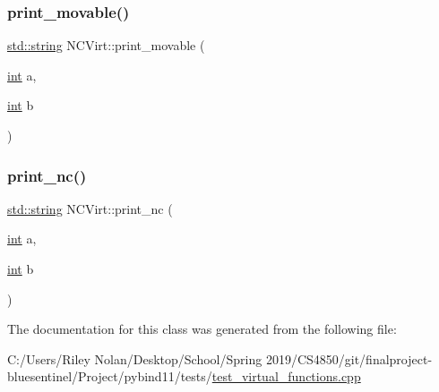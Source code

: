 \mbox{\label{class_n_c_virt_a215b109d2ee58a323ca9628df7e9dacc}} 
\subsubsection{\texorpdfstring{print\_movable()}{print\_movable()}}
{\footnotesize\ttfamily \mbox{\hyperlink{_s_d_l__opengl__glext_8h_ab4ccfaa8ab0e1afaae94dc96ef52dde1}{std\+::string}} N\+C\+Virt\+::print\+\_\+movable (\begin{DoxyParamCaption}\item[{\mbox{\hyperlink{warnings_8h_a74f207b5aa4ba51c3a2ad59b219a423b}{int}}}]{a,  }\item[{\mbox{\hyperlink{warnings_8h_a74f207b5aa4ba51c3a2ad59b219a423b}{int}}}]{b }\end{DoxyParamCaption})\hspace{0.3cm}{\ttfamily [inline]}}

\mbox{\label{class_n_c_virt_a2faacf010762ae47c633a828c6710e99}} 
\subsubsection{\texorpdfstring{print\_nc()}{print\_nc()}}
{\footnotesize\ttfamily \mbox{\hyperlink{_s_d_l__opengl__glext_8h_ab4ccfaa8ab0e1afaae94dc96ef52dde1}{std\+::string}} N\+C\+Virt\+::print\+\_\+nc (\begin{DoxyParamCaption}\item[{\mbox{\hyperlink{warnings_8h_a74f207b5aa4ba51c3a2ad59b219a423b}{int}}}]{a,  }\item[{\mbox{\hyperlink{warnings_8h_a74f207b5aa4ba51c3a2ad59b219a423b}{int}}}]{b }\end{DoxyParamCaption})\hspace{0.3cm}{\ttfamily [inline]}}



The documentation for this class was generated from the following file\+:\begin{DoxyCompactItemize}
\item 
C\+:/\+Users/\+Riley Nolan/\+Desktop/\+School/\+Spring 2019/\+C\+S4850/git/finalproject-\/bluesentinel/\+Project/pybind11/tests/\mbox{\hyperlink{test__virtual__functions_8cpp}{test\+\_\+virtual\+\_\+functions.\+cpp}}\end{DoxyCompactItemize}
